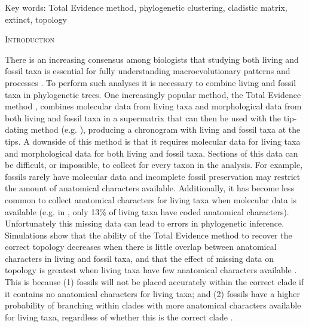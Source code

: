 \documentclass[12pt,letterpaper]{article}
\renewcommand{\section}[1]{%
\bigskip
\begin{center}
\begin{Large}
\normalfont\scshape #1
\medskip
\end{Large}
\end{center}}
\begin{document}
\noindent Key words: Total Evidence method, phylogenetic clustering, cladistic matrix, extinct, topology\\

\vspace{1.5in}

%
%
\newpage 
\section{Introduction}

There is an increasing consensus among biologists that studying both living and fossil taxa is essential for fully understanding macroevolutionary patterns and processes \cite{slaterunifying2013,fritzdiversity2013}.
To perform such analyses it is necessary to combine living and fossil taxa in phylogenetic trees.
One increasingly popular method, the Total Evidence method \cite{ronquista2012}, combines molecular data from living taxa and morphological data %
 from both living and fossil taxa in a supermatrix that can then be used with the tip-dating method  (e.g. \cite{pyrondivergence2011,ronquista2012,schragocombining2013,slaterunifying2013,beckancient2014}), producing a chronogram with living and fossil taxa at the tips. 
A downside of this method is that it requires molecular data for living taxa and morphological data for both living and fossil taxa. %
Sections of this data can be difficult, or impossible, to collect for every taxon in the analysis.
For example, fossils rarely have molecular data and incomplete fossil preservation may restrict the amount of anatomical characters available.
Additionally, it has become less common to collect anatomical characters for living taxa when molecular data is available (e.g. in \cite{slaterphylogenetic2013}, only 13\% of living taxa have coded anatomical characters).
Unfortunately this missing data can lead to errors in phylogenetic inference.
Simulations show that the ability of the Total Evidence method to recover the correct topology decreases when there is little overlap between anatomical characters in living and fossil taxa, and that the effect of missing data on topology is greatest when living taxa have few anatomical characters available \cite{GuillermeCooper}.
This is because (1) fossils will not be placed accurately within the correct clade if it contains no anatomical characters for living taxa; and (2) fossils have a higher probability of branching within clades with more anatomical characters available for living taxa, regardless of whether this is the correct clade \cite{GuillermeCooper}. 
\end{document}
